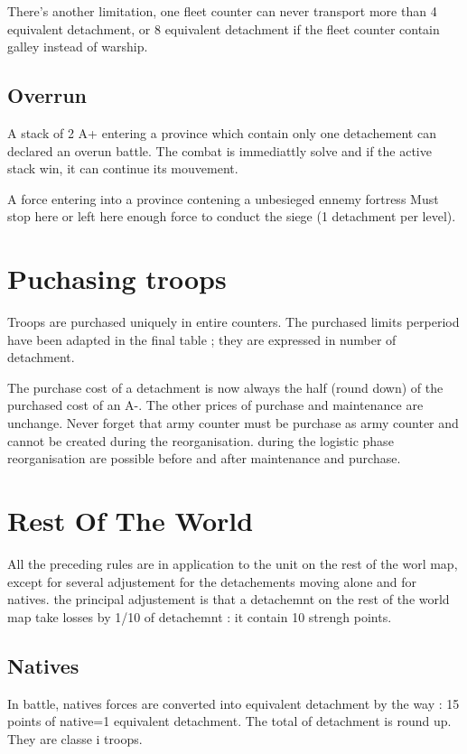 \maritime

There's another limitation, one fleet counter can never transport more
than 4 equivalent detachment, or 8 equivalent detachment if the fleet
counter contain galley instead of warship.

\subsection{Overrun}
A stack of 2 A+  entering a province which contain only one detachement 
can declared an overun battle. The combat is immediattly solve and if the
active stack win, it can continue its mouvement.

A force entering into a province contening a unbesieged ennemy fortress
Must stop here or left here enough force to conduct the siege (1
detachment per level).


\section{Puchasing troops}
Troops are purchased uniquely in entire counters. The purchased limits   
perperiod have been adapted in the final table ; they are expressed in
number of detachment.

The purchase cost of a detachment is now always the half (round down) of
the purchased cost of an A-. The other prices of purchase and maintenance
are unchange. Never forget that army counter must be purchase as army
counter and cannot be created during the reorganisation. during the
logistic phase reorganisation are possible before and after maintenance
and purchase.

\recrutement

\section{Rest Of The World}

All the preceding rules are in application to the unit on the rest of the
worl map, except for several adjustement for the detachements moving alone
and for natives. the principal adjustement is that a detachemnt on the rest
of the world map take losses by 1/10 of detachemnt : it contain 10 strengh
points.

\subsection{Natives}
In battle, natives forces are converted into equivalent detachment by the
way : 15 points of native=1 equivalent detachment. The total of detachment
is round up. They are classe i troops.

